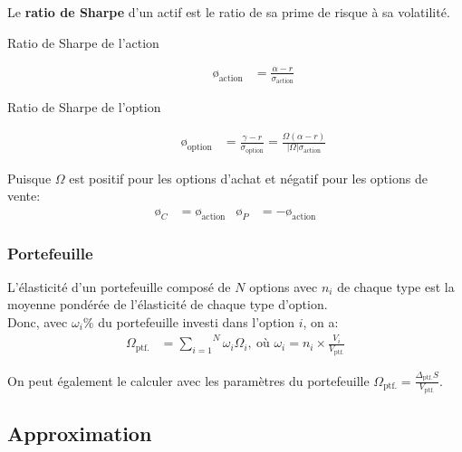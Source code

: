 \documentclass[10pt, french]{article}
\begin{document}
\begin{multicols*}{2}
\begin{definitionNOHFILL}
Le \textbf{ratio de Sharpe} d'un actif est le ratio de sa prime de risque à sa volatilité.
\begin{description}
	\item[Ratio de Sharpe de l'action]	
		\begin{align*}
		\text{\o}_{\text{action}}	
		&=	\frac{\alpha - r}{\sigma_{\text{action}}}
		\end{align*}
	\item[Ratio de Sharpe de l'option]	
		\begin{align*}
		\text{\o}_{\text{option}}	
		&=	\frac{\gamma - r}{\sigma_{\text{option}}}	
		=	\frac{\Omega (\alpha - r)}{|\Omega|\sigma_{\text{action}}}	
		\end{align*}
\end{description}
Puisque $\Omega$ est positif pour les options d'achat et négatif pour les options de vente:
\begin{align*}
	\text{\o}_{C}	&=	\text{\o}_{\text{action}}	&
	\text{\o}_{P}	&=	-\text{\o}_{\text{action}}
\end{align*}
\end{definitionNOHFILL}

\subsubsection*{Portefeuille}

L'élasticité d'un portefeuille composé de $N$ options avec $n_{i}$ de chaque type est la moyenne pondérée de l'élasticité de chaque type d'option.\\
Donc, avec $\omega_{i}$\% du portefeuille investi dans l'option $i$, on a:
\begin{align*}
	\Omega_{\text{ptf.}}
	&=	\overset{N}{\underset{i = 1}{\sum}} \omega_{i} \Omega_{i}, \: \text{où } \omega_{i} = n_{i} \times \frac{V_{i}}{V_{\text{ptf.}}}
\end{align*}

On peut également le calculer avec les paramètres du portefeuille $\Omega_{\text{ptf.}} = \frac{\Delta_{\text{ptf.}}S}{V_{\text{ptf.}}}$.

\subsection{Approximation}


\end{multicols*}
\end{document}
